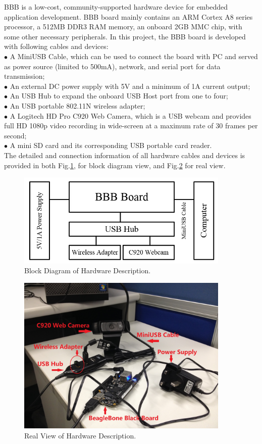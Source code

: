\documentclass[12pt,journal,draftclsnofoot,onecolumn]{IEEEtran}
\begin{document}
BBB is a low-cost, community-supported hardware device for embedded application development. BBB board mainly contains an ARM Cortex A8 series processor, a 512MB DDR3 RAM memory, an onboard 2GB MMC chip, with some other necessary peripherals. In this project, the BBB board is developed with following cables and devices: \\

$\bullet$ A MiniUSB Cable, which can be used to connect the board with PC and served as power source (limited to 500mA), network, and serial port for data transmission;\\
$\bullet$ An external DC power supply with 5V and a minimum of 1A current output;\\
$\bullet$ An USB Hub to expand the onboard USB Host port from one to four;\\
$\bullet$ An USB portable 802.11N wireless adapter;\\
$\bullet$ A Logitech HD Pro C920 Web Camera, which is a USB webcam and provides full HD 1080p video recording in wide-screen at a maximum rate of 30 frames per second;\\
$\bullet$ A mini SD card and its corresponding USB portable card reader.\\
The detailed and connection information of all hardware cables and devices is provided in both Fig.\ref{hw1}, for block diagram view, and Fig.\ref{hw2} for real view.
\begin{figure}[ht]
	\centering
	\includegraphics[width=4in]{./figs/hw1.jpg}
	\caption{Block Diagram of Hardware Description.}
	\label{hw1}
\end{figure}
\begin{figure}[ht]
	\centering
	\includegraphics[width=4in]{./figs/hw2.jpg}
	\caption{Real View of Hardware Description.}
	\label{hw2}
\end{figure}
\end{document}
